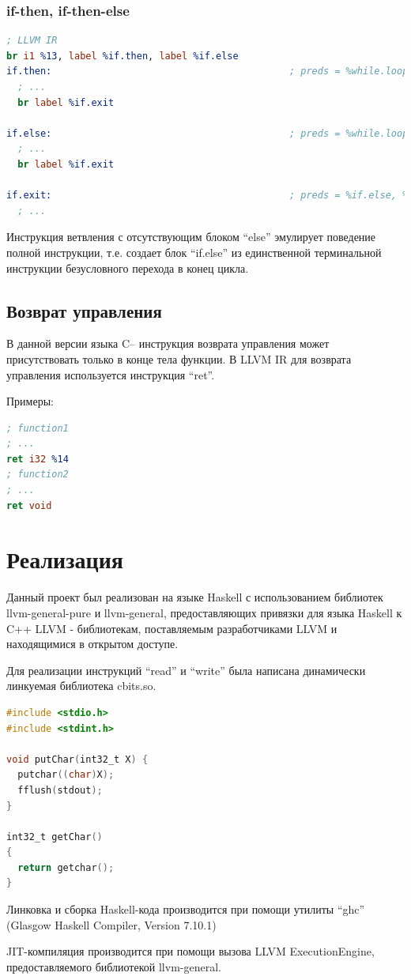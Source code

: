 \documentclass[a4paper,12pt]{report}
\numberwithin{equation}{section}
\begin{document}
\subsubsection*{if-then, if-then-else}
\begin{lstlisting}[language=llvm]
; LLVM IR
br i1 %13, label %if.then, label %if.else
if.then:                                          ; preds = %while.loop
  ; ...
  br label %if.exit

if.else:                                          ; preds = %while.loop
  ; ...
  br label %if.exit

if.exit:                                          ; preds = %if.else, %if.then
  ; ...
\end{lstlisting}
Инструкция ветвления с отсутствующим блоком ``else'' эмулирует поведение полной инструкции, т.е. создает блок ``if.else'' из единственной 
терминальной инструкции безусловного перехода в конец цикла. 

\subsection{Возврат управления}
В данной версии языка C-- инструкция возврата управления может присутствовать только в конце тела функции. В LLVM IR для возврата управления используется
инструкция ``ret''.

Примеры:
\begin{lstlisting}[language=llvm]
; function1
; ...
ret i32 %14
; function2
; ...
ret void
\end{lstlisting}

\section{Реализация}
Данный проект был реализован на языке Haskell с использованием библиотек llvm-general-pure и llvm-general, предоставляющих привязки для языка Haskell к C++ LLVM - библиотекам, поставляемым разработчиками LLVM и находящимися в открытом доступе.


Для реализации инструкций ``read'' и ``write'' была написана динамически линкуемая библиотека cbits.so.
\begin{lstlisting}[language=C]
#include <stdio.h>
#include <stdint.h>

void putChar(int32_t X) {
  putchar((char)X);
  fflush(stdout);
}

int32_t getChar() 
{
  return getchar();
}
\end{lstlisting}
Линковка и сборка Haskell-кода производится при помощи утилиты ``ghc'' (Glasgow Haskell Compiler, Version 7.10.1)


JIT-компиляция производится при помощи вызова LLVM ExecutionEngine, предоставляемого библиотекой llvm-general.
\end{document}
